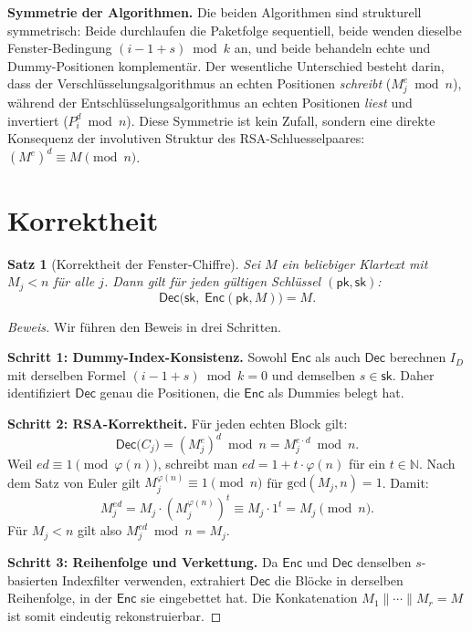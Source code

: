 ﻿\documentclass[12pt, a4paper]{article}
\theoremstyle{plain}
\newtheorem{theorem}{Satz}[section]
\theoremstyle{definition}
\theoremstyle{remark}
\newenvironment{myproof}[1][Beweis]{%
  \begin{proof}[#1]
}{%
  \end{proof}
}
\newcommand{\N}{\mathbb{N}}
\newcommand{\pk}{\mathsf{pk}}
\newcommand{\sk}{\mathsf{sk}}
\newcommand{\Enc}{\mathsf{Enc}}
\newcommand{\Dec}{\mathsf{Dec}}
\newcommand{\GCD}{\mathrm{gcd}}
\begin{document}
\medskip
\noindent\textbf{Symmetrie der Algorithmen.}
Die beiden Algorithmen sind strukturell symmetrisch: Beide durchlaufen
die Paketfolge sequentiell, beide wenden dieselbe Fenster-Bedingung
$(i - 1 + s) \bmod k$ an, und beide behandeln echte und Dummy-Positionen
komplementär. Der wesentliche Unterschied besteht darin, dass der
Verschl\"usselungsalgorithmus an echten Positionen \emph{schreibt}
($M_j^e \bmod n$), w\"ahrend der Entschl\"usselungsalgorithmus an echten
Positionen \emph{liest} und invertiert ($P_i^d \bmod n$). Diese Symmetrie
ist kein Zufall, sondern eine direkte Konsequenz der involutiven Struktur
des RSA-Schluesselpaa\-res: $(M^e)^d \equiv M \pmod{n}$.

\section{Korrektheit}
\label{sec:korrektheit}

\begin{theorem}[Korrektheit der Fenster-Chiffre]\label{thm:korrektheit}
  Sei $M$ ein beliebiger Klartext mit $M_j < n$ f\"ur alle $j$.
  Dann gilt f\"ur jeden g\"ultigen Schl\"ussel $(\pk,\sk)$:
  \[
    \Dec\!\bigl(\sk,\;\Enc(\pk, M)\bigr) = M.
  \]
\end{theorem}

\begin{myproof}
  Wir f\"uhren den Beweis in drei Schritten.

  \medskip\noindent\textbf{Schritt 1: Dummy-Index-Konsistenz.}
  Sowohl $\Enc$ als auch $\Dec$ berechnen $I_D$ mit derselben Formel
  $(i-1+s) \bmod k = 0$ und demselben $s \in \sk$. Daher identifiziert
  $\Dec$ genau die Positionen, die $\Enc$ als Dummies belegt hat.

  \medskip\noindent\textbf{Schritt 2: RSA-Korrektheit.}
  F\"ur jeden echten Block gilt:
  \[
    \Dec\!\bigl(C_j\bigr) = (M_j^e)^d \bmod n = M_j^{e \cdot d} \bmod n.
  \]
  Weil $ed \equiv 1 \pmod{\varphi(n)}$, schreibt man $ed = 1 + t\cdot\varphi(n)$
  f\"ur ein $t \in \N$. Nach dem Satz von Euler gilt $M_j^{\varphi(n)} \equiv 1 \pmod{n}$
  f\"ur $\GCD(M_j, n) = 1$. Damit:
  \[
    M_j^{ed} = M_j \cdot (M_j^{\varphi(n)})^t \equiv M_j \cdot 1^t = M_j \pmod{n}.
  \]
  F\"ur $M_j < n$ gilt also $M_j^{ed} \bmod n = M_j$.

  \medskip\noindent\textbf{Schritt 3: Reihenfolge und Verkettung.}
  Da $\Enc$ und $\Dec$ denselben $s$-basierten Indexfilter verwenden,
  extrahiert $\Dec$ die Bl\"ocke in derselben Reihenfolge, in der $\Enc$
  sie eingebettet hat. Die Konkatenation $M_1 \| \cdots \| M_r = M$
  ist somit eindeutig rekonstruierbar. 
\end{myproof}
\end{document}
